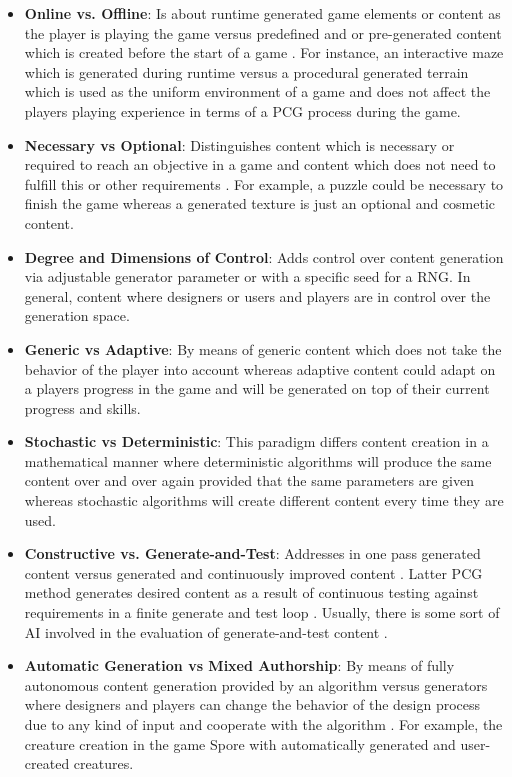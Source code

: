 \documentclass[MGS,Master,english]{twbook}%
\begin{document}
\begin{itemize}
	\item \textbf{Online vs. Offline}: Is about runtime generated game elements or content as the player is playing the game versus predefined and or pre-generated content which is created before the start of a game \cite{pcg::book}. For instance, an interactive maze which is generated during runtime versus a procedural generated terrain which is used as the uniform environment of a game and does not affect the players playing experience in terms of a \ac{PCG} process during the game.
	\item \textbf{Necessary vs Optional}: Distinguishes content which is necessary or required to reach an objective in a game and content which does not need to fulfill this or other requirements \cite{pcg::book}. For example, a puzzle could be necessary to finish the game whereas a generated texture is just an optional and cosmetic content.
	\item \textbf{Degree and Dimensions of Control}: Adds control over content generation via adjustable generator parameter or with a specific seed for a \ac{RNG}. In general, content where designers or users and players are in control over the generation space. \cite{pcg::book}
	\item \textbf{Generic vs Adaptive}: By means of generic content which does not take the behavior of the player into account whereas adaptive content could adapt on a players progress in the game and will be generated on top of their current progress and skills. \cite{pcg::book}
	\item \textbf{Stochastic vs Deterministic}: This paradigm differs content creation in a mathematical manner where deterministic algorithms will produce the same content over and over again provided that the same parameters are given whereas stochastic algorithms will create different content every time they are used. \cite{pcg::book}
	\item \textbf{Constructive vs. Generate-and-Test}: Addresses in one pass generated content versus generated and continuously improved content \cite{pcg::book}. Latter \ac{PCG} method generates desired content as a result of continuous testing against requirements in a finite generate and test loop \cite{pcg::book}. Usually, there is some sort of \ac{AI} involved in the evaluation of generate-and-test content \cite{pcg::book}. 
	\item \textbf{Automatic Generation vs Mixed Authorship}: By means of fully autonomous content generation provided by an algorithm versus generators where designers and players can change the behavior of the design process due to any kind of input and cooperate with the algorithm \cite{pcg::book}. For example, the creature creation in the game Spore \cite{game::spore} with automatically generated and user-created creatures.
\end{itemize}
\end{document}
